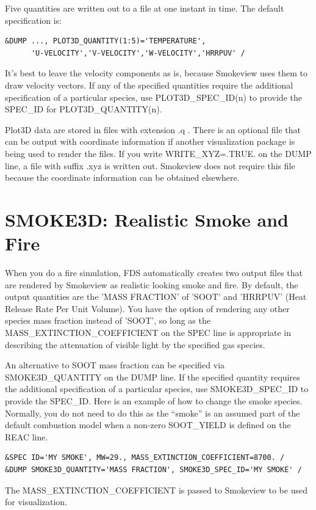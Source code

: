 \documentclass[11pt]{book}
\begin{document}
Five quantities are written out to a file at one instant in time. The default specification is:
\begin{lstlisting}
&DUMP ..., PLOT3D_QUANTITY(1:5)='TEMPERATURE',
      'U-VELOCITY','V-VELOCITY','W-VELOCITY','HRRPUV' /
\end{lstlisting}
It's best to leave the velocity components as is, because Smokeview
uses them to draw velocity vectors. If any of the specified quantities require the additional specification of a particular species,
use {\ct PLOT3D\_SPEC\_ID(n)} to provide the {\ct SPEC\_ID} for {\ct PLOT3D\_QUANTITY(n)}.

Plot3D data are stored in files with extension {\ct .q} . There is
an optional file that can be output with coordinate information
if another visualization package is being used to render the
files. If you write {\ct WRITE\_XYZ=.TRUE.} on the {\ct DUMP}
line, a file with suffix {\ct .xyz} is written out. Smokeview
does not require this file because the coordinate information can be
obtained elsewhere.



\section{SMOKE3D: Realistic Smoke and Fire}
\label{info:SMOKE3D}

When you do a fire simulation, FDS automatically creates two output files that are rendered by Smokeview as realistic looking smoke and fire. By default, the output quantities are the {\ct 'MASS FRACTION'} of {\ct 'SOOT'} and {\ct 'HRRPUV'} (Heat Release Rate Per Unit Volume). You have the option of rendering any other species mass fraction instead of {\ct 'SOOT'}, so long as the {\ct MASS\_EXTINCTION\_COEFFICIENT} on the {\ct SPEC} line is appropriate in
describing the attenuation of visible light by the specified gas species.

An alternative to {\ct SOOT} mass fraction can be specified via {\ct SMOKE3D\_QUANTITY} on the {\ct DUMP} line. If the specified quantity requires the additional specification of a particular species, use {\ct SMOKE3D\_SPEC\_ID} to provide the {\ct SPEC\_ID}. Here is an example of how to change the smoke species. Normally, you do not need to do this as the ``smoke'' is an assumed part of the default combustion model when a non-zero {\ct SOOT\_YIELD} is defined on the {\ct REAC} line.
\begin{lstlisting}
&SPEC ID='MY SMOKE', MW=29., MASS_EXTINCTION_COEFFICIENT=8700. /
&DUMP SMOKE3D_QUANTITY='MASS FRACTION', SMOKE3D_SPEC_ID='MY SMOKE' /
\end{lstlisting}
The {\ct MASS\_EXTINCTION\_COEFFICIENT} is passed to Smokeview to be used for visualization.
\end{document}
